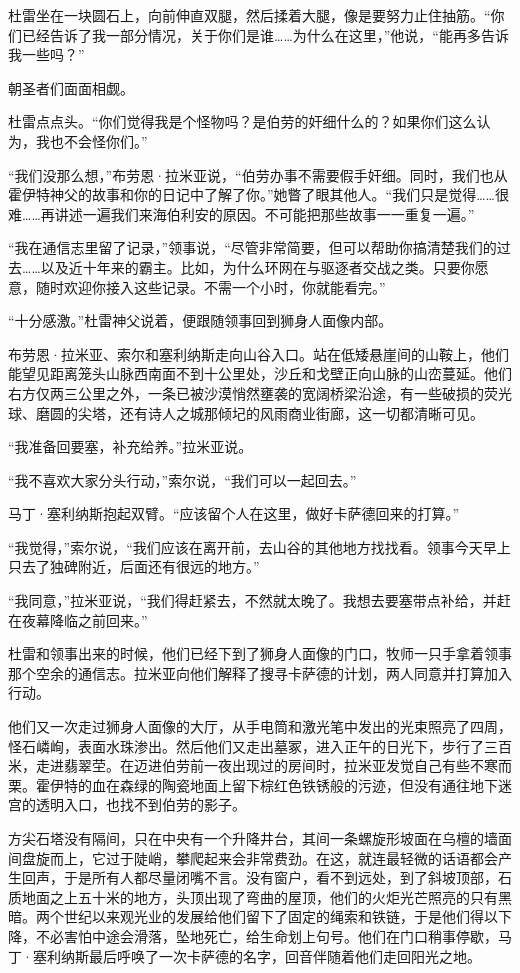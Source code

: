 \documentclass[AutoFakeBold=true]{book}
\begin{document}
杜雷坐在一块圆石上，向前伸直双腿，然后揉着大腿，像是要努力止住抽筋。``你们已经告诉了我一部分情况，关于你们是谁……为什么在这里，''他说，``能再多告诉我一些吗？''

朝圣者们面面相觑。

杜雷点点头。``你们觉得我是个怪物吗？是伯劳的奸细什么的？如果你们这么认为，我也不会怪你们。''

``我们没那么想，''布劳恩·拉米亚说，``伯劳办事不需要假手奸细。同时，我们也从霍伊特神父的故事和你的日记中了解了你。''她瞥了眼其他人。``我们只是觉得……很难……再讲述一遍我们来海伯利安的原因。不可能把那些故事一一重复一遍。''

``我在通信志里留了记录，''领事说，``尽管非常简要，但可以帮助你搞清楚我们的过去……以及近十年来的霸主。比如，为什么环网在与驱逐者交战之类。只要你愿意，随时欢迎你接入这些记录。不需一个小时，你就能看完。''

``十分感激。''杜雷神父说着，便跟随领事回到狮身人面像内部。

布劳恩·拉米亚、索尔和塞利纳斯走向山谷入口。站在低矮悬崖间的山鞍上，他们能望见距离笼头山脉西南面不到十公里处，沙丘和戈壁正向山脉的山峦蔓延。他们右方仅两三公里之外，一条已被沙漠悄然壅袭的宽阔桥梁沿途，有一些破损的荧光球、磨圆的尖塔，还有诗人之城那倾圮的风雨商业街廊，这一切都清晰可见。

``我准备回要塞，补充给养。''拉米亚说。

``我不喜欢大家分头行动，''索尔说，``我们可以一起回去。''

马丁·塞利纳斯抱起双臂。``应该留个人在这里，做好卡萨德回来的打算。''

``我觉得，''索尔说，``我们应该在离开前，去山谷的其他地方找找看。领事今天早上只去了独碑附近，后面还有很远的地方。''

``我同意，''拉米亚说，``我们得赶紧去，不然就太晚了。我想去要塞带点补给，并赶在夜幕降临之前回来。''

杜雷和领事出来的时候，他们已经下到了狮身人面像的门口，牧师一只手拿着领事那个空余的通信志。拉米亚向他们解释了搜寻卡萨德的计划，两人同意并打算加入行动。

他们又一次走过狮身人面像的大厅，从手电筒和激光笔中发出的光束照亮了四周，怪石嶙峋，表面水珠渗出。然后他们又走出墓冢，进入正午的日光下，步行了三百米，走进翡翠茔。在迈进伯劳前一夜出现过的房间时，拉米亚发觉自己有些不寒而栗。霍伊特的血在森绿的陶瓷地面上留下棕红色铁锈般的污迹，但没有通往地下迷宫的透明入口，也找不到伯劳的影子。

方尖石塔没有隔间，只在中央有一个升降井台，其间一条螺旋形坡面在乌檀的墙面间盘旋而上，它过于陡峭，攀爬起来会非常费劲。在这，就连最轻微的话语都会产生回声，于是所有人都尽量闭嘴不言。没有窗户，看不到远处，到了斜坡顶部，石质地面之上五十米的地方，头顶出现了弯曲的屋顶，他们的火炬光芒照亮的只有黑暗。两个世纪以来观光业的发展给他们留下了固定的绳索和铁链，于是他们得以下降，不必害怕中途会滑落，坠地死亡，给生命划上句号。他们在门口稍事停歇，马丁·塞利纳斯最后呼唤了一次卡萨德的名字，回音伴随着他们走回阳光之地。
\end{document}
